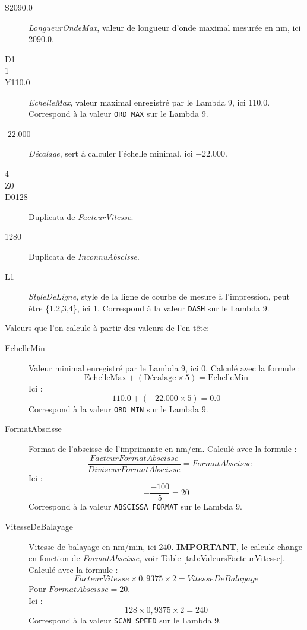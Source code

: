 \documentclass[a4paper, 12pt]{article}
\begin{document}
\begin{description}
	\item[S2090.0] \emph{LongueurOndeMax}, valeur de longueur d'onde maximal mesurée en nm, ici 2090.0.
	\item[D1]
	\item[1]
	\item[Y110.0] \emph{EchelleMax}, valeur maximal enregistré par le Lambda 9, ici 110.0.
		Correspond à la valeur \verb|ORD MAX| sur le Lambda 9.
	\item[-22.000] \emph{Décalage}, sert à calculer l'échelle minimal, ici $-22.000$.
	\item[4]
	\item[Z0]
	\item[D0128] Duplicata de \emph{FacteurVitesse}.
	\item[1280] Duplicata de \emph{InconnuAbscisse}.
	\item[L1] \emph{StyleDeLigne}, style de la ligne de courbe de mesure à l'impression, peut être \{1,2,3,4\}, ici 1.
		Correspond à la valeur \verb|DASH| sur le Lambda 9.\\

\end{description}


Valeurs que l'on calcule à partir des valeurs de l'en-tête:

\begin{description}
	\item[EchelleMin] Valeur minimal enregistré par le Lambda 9, ici 0.
		Calculé avec la formule : 
		$$ \text{EchelleMax} + ( \text{Décalage} \times 5 ) = \text{EchelleMin}$$
		Ici :
		$$110.0 + ( -22.000 \times 5 ) = 0.0$$ 
		Correspond à la valeur \verb|ORD MIN| sur le Lambda 9.

	\item[FormatAbscisse] Format de l'abscisse de l'imprimante en nm/cm. 
		Calculé avec la formule : 
		$$ { - \frac{FacteurFormatAbscisse}{DiviseurFormatAbscisse} } = FormatAbscisse $$ 
		Ici :
		$$ - \frac{-100}{5} = 20$$ 
		Correspond à la valeur \verb|ABSCISSA FORMAT| sur le Lambda 9.

	\item[VitesseDeBalayage] Vitesse de balayage en nm/min, ici 240. 
		\textbf{IMPORTANT}, le calcule change en fonction de \emph{FormatAbscisse}, voir Table \ref{tab:ValeursFacteurVitesse}.
		Calculé avec la formule : 
		$$FacteurVitesse \times 0,9375 \times 2 = VitesseDeBalayage$$
		Pour $ FormatAbscisse = 20 $.
		\\
		Ici :
		$$128 \times 0,9375 \times 2 = 240$$ 
		Correspond à la valeur \verb|SCAN SPEED| sur le Lambda 9.



\end{description}
\end{document}
